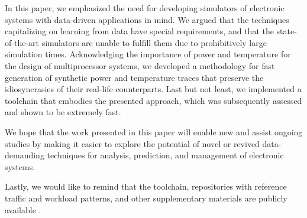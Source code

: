 In this paper, we emphasized the need for developing simulators of electronic
systems with data-driven applications in mind. We argued that the techniques
capitalizing on learning from data have special requirements, and that the
state-of-the-art simulators are unable to fulfill them due to prohibitively
large simulation times. Acknowledging the importance of power and temperature
for the design of multiprocessor systems, we developed a methodology for fast
generation of synthetic power and temperature traces that preserve the
idiosyncrasies of their real-life counterparts. Last but not least, we
implemented a toolchain that embodies the presented approach, which was
subsequently assessed and shown to be extremely fast.

We hope that the work presented in this paper will enable new and assist ongoing
studies by making it easier to explore the potential of novel or revived
data-demanding techniques for analysis, prediction, and management of electronic
systems.

Lastly, we would like to remind that the toolchain, repositories with reference
traffic and workload patterns, and other supplementary materials are publicly
available \cite{sources}.
